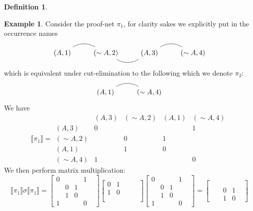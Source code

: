 \documentclass[12pt]{article}
\theoremstyle{plain}
\theoremstyle{definition}
\newtheorem{defn}[thm]{Definition} %
\newtheorem{example}[thm]{Example}
\newcommand{\negation}{\sim}
\begin{document}
\begin{defn}
\begin{example}\label{ex:axiom_GoI}
Consider the proof-net $\pi_1$, for clarity sakes we explicitly put in the occurrence names
\begin{equation}
\begin{tikzcd}
(A,1)\arrow[r,bend left, dash] & (\negation A,2)\arrow[r,bend right, dash] & (A,3)\arrow[r, bend left, dash] & (\negation A,4)
\end{tikzcd}
\end{equation}
which is equivalent under cut-elimination to the following which we denote $\pi_2$:
\begin{equation}
\begin{tikzcd}
(A,1)\arrow[r, bend left, dash] & (\negation A,4)
\end{tikzcd}
\end{equation}
We have
\begin{equation}
\llbracket \pi_1 \rrbracket = 
\begin{matrix}
& (A,3) & (\negation A,2) & (A,1) & (\negation A,4)\\
(A,3) & 0&&&1\\
(\negation A,2) &&0&1&\\
(A,1)&&1&0&\\
(\negation A,4)&1&&&0
\end{matrix}
\end{equation}
We then perform matrix multiplication:
\begin{equation}
\llbracket \pi_1 \rrbracket \sigma \llbracket \pi_1 \rrbracket = 
\begin{bmatrix}
0&&&1\\
&0&1&\\
&1&0&&\\
1&&&0
\end{bmatrix}
\begin{bmatrix}
0&1&&\\
1&0&&\\
&&&&\\
&&&&
\end{bmatrix}
\begin{bmatrix}
0&&&1\\
&0&1&\\
&1&0&&\\
1&&&0
\end{bmatrix}
=
\begin{bmatrix}
&&&&\\
&&&&\\
&&0&1\\
&&1&0
\end{bmatrix}

\end{equation}
\end{example}
\end{defn}
\end{document}
